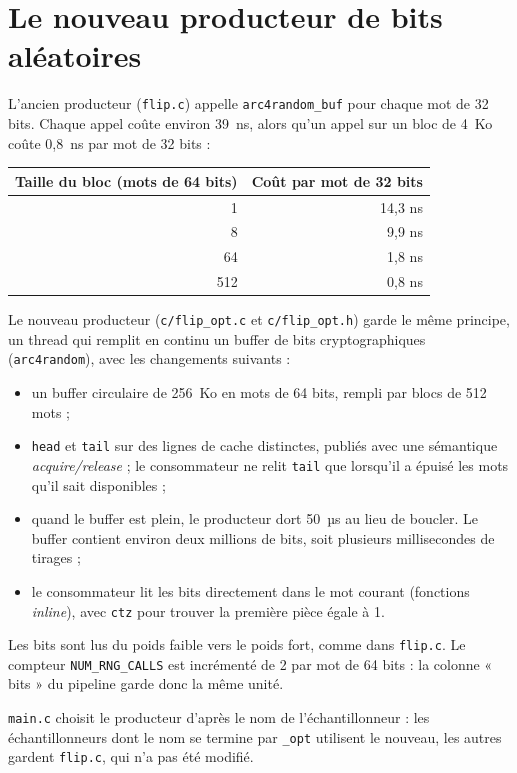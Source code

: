 \documentclass[11pt,a4paper]{article}
\newcommand{\code}[1]{\texttt{#1}}
\begin{document}
\section{Le nouveau producteur de bits aléatoires}
\label{sec:producteur}

L'ancien producteur (\code{flip.c}) appelle \code{arc4random\_buf} pour chaque mot de
32 bits. Chaque appel coûte environ 39~ns, alors qu'un appel sur un bloc de 4~Ko
coûte 0,8~ns par mot de 32 bits :

\begin{table}[H]
\centering
\small
\begin{tabular}{rr}
\toprule
Taille du bloc (mots de 64 bits) & Coût par mot de 32 bits \\
\midrule
1 & 14,3 ns \\
8 & 9,9 ns \\
64 & 1,8 ns \\
512 & 0,8 ns \\
\bottomrule
\end{tabular}
\end{table}

Le nouveau producteur (\code{c/flip\_opt.c} et \code{c/flip\_opt.h}) garde le même
principe, un thread qui remplit en continu un buffer de bits cryptographiques
(\code{arc4random}), avec les changements suivants :
\begin{itemize}
\item un buffer circulaire de 256~Ko en mots de 64 bits, rempli par blocs de 512 mots ;
\item \code{head} et \code{tail} sur des lignes de cache distinctes, publiés avec une
  sémantique \emph{acquire/release} ; le consommateur ne relit \code{tail} que
  lorsqu'il a épuisé les mots qu'il sait disponibles ;
\item quand le buffer est plein, le producteur dort 50~µs au lieu de boucler. Le buffer
  contient environ deux millions de bits, soit plusieurs millisecondes de tirages ;
\item le consommateur lit les bits directement dans le mot courant (fonctions
  \emph{inline}), avec \code{ctz} pour trouver la première pièce égale à 1.
\end{itemize}
Les bits sont lus du poids faible vers le poids fort, comme dans \code{flip.c}. Le
compteur \code{NUM\_RNG\_CALLS} est incrémenté de 2 par mot de 64 bits : la colonne
« bits » du pipeline garde donc la même unité.

\code{main.c} choisit le producteur d'après le nom de l'échantillonneur : les
échantillonneurs dont le nom se termine par \code{\_opt} utilisent le nouveau,
les autres gardent \code{flip.c}, qui n'a pas été modifié.
\end{document}
